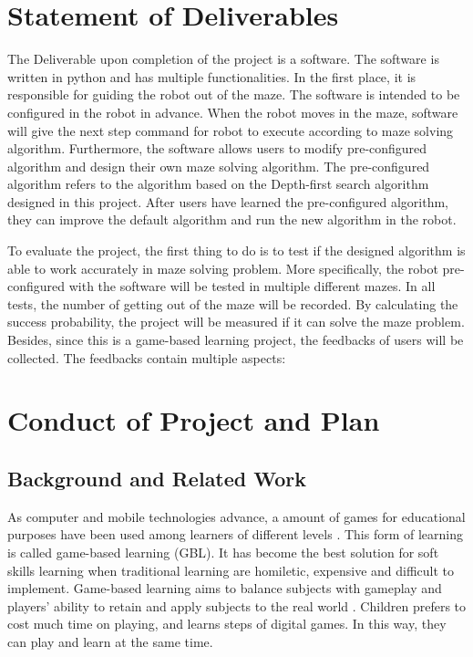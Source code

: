 \documentclass[11pt,times,oneside,openright,hardcopy]{eeereport}
\begin{document}
\section{Statement of Deliverables}
The Deliverable upon completion of the project is a software. The software is written in python and has multiple functionalities. In the first place, it is responsible for guiding the robot out of the maze.
The software is intended to be configured in the robot in advance. When the robot moves in the maze, software will give the next step command for robot to execute according to maze solving algorithm.
Furthermore, the software allows users to modify pre-configured algorithm and design their own maze solving algorithm. The pre-configured algorithm refers to the algorithm based on the Depth-first search algorithm designed in this project.
After users have learned the pre-configured algorithm, they can improve the default algorithm and run the new algorithm in the robot.

To evaluate the project, the first thing to do is to test if the designed algorithm is able to work accurately in maze solving problem. More specifically, the robot pre-configured with the software will be tested in multiple different mazes.
In all tests, the number of getting out of the maze will be recorded. By calculating the success probability, the project will be measured if it can solve the maze problem.
Besides, since this is a game-based learning project, the feedbacks of users will be collected. The feedbacks contain multiple aspects:


\section{Conduct of Project and Plan}
\subsection{Background and Related Work}
As computer and mobile technologies advance, a amount of games for educational purposes have been used among learners of different levels \cite{Proulx:2018fr}. 
This form of learning is called game-based learning (GBL). It has become the best solution for soft skills learning when traditional learning are homiletic, expensive and difficult to implement.
Game-based learning aims to balance subjects with gameplay and players' ability to retain and apply subjects to the real world \cite{Ifenthaler:2012tn}. 
Children prefers to cost much time on playing, and learns steps of digital games. In this way, they can play and learn at the same time.
\end{document}
